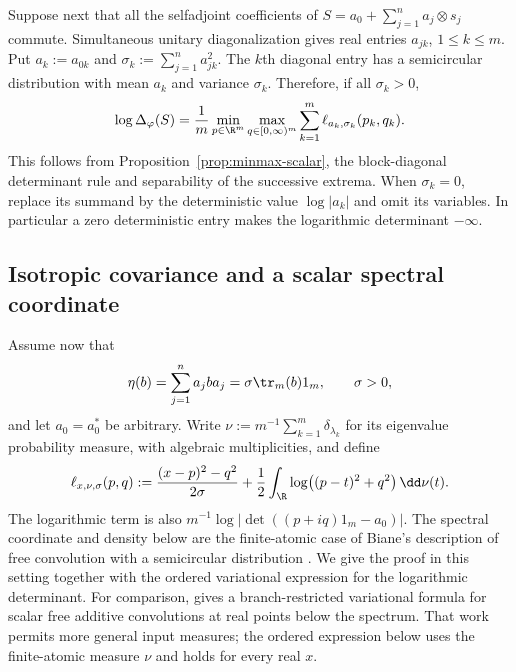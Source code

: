 Suppose next that all the selfadjoint coefficients of $S=a_0+\sum_{j=1}^n a_j\otimes s_j$ commute.
Simultaneous unitary diagonalization gives real entries $a_{jk}$, $1\le k\le m$.
Put $a_k:=a_{0k}$ and $\sigma_k:=\sum_{j=1}^n a_{jk}^2$.
The $k$th diagonal entry has a semicircular distribution with mean $a_k$ and variance $\sigma_k$.
Therefore, if all $\sigma_k>0$,
\begin{equation}\label{eq:minmax-commuting}
 \log\Delta_\varphi(S)
 =\frac1m\min_{p\in\R^m}\max_{q\in[0,\infty)^m}
       \sum_{k=1}^m\ell_{a_k,\sigma_k}(p_k,q_k).
\end{equation}
This follows from Proposition~\ref{prop:minmax-scalar}, the block-diagonal determinant rule and separability of the successive extrema.
When $\sigma_k=0$, replace its summand by the deterministic value $\log|a_k|$ and omit its variables.
In particular a zero deterministic entry makes the logarithmic determinant $-\infty$.

\subsection{Isotropic covariance and a scalar spectral coordinate}

Assume now that
\begin{equation}\label{eq:minmax-isotropy}
 \eta(b)=\sum_{j=1}^n a_jba_j
       =\sigma\tr_m(b)1_m,\qquad \sigma>0,
\end{equation}
and let $a_0=a_0^*$ be arbitrary.
Write $\nu:=m^{-1}\sum_{k=1}^m\delta_{\lambda_k}$ for its eigenvalue probability measure, with algebraic multiplicities, and define
\[
 \ell_{x,\nu,\sigma}(p,q)
 :=\frac{(x-p)^2-q^2}{2\sigma}
   +\frac12\int_\R\log\bigl((p-t)^2+q^2\bigr)\,\dd\nu(t).
\]
The logarithmic term is also $m^{-1}\log|\det((p+iq)1_m-a_0)|$.
The spectral coordinate and density below are the finite-atomic case of Biane's description of free convolution with a semicircular distribution \cite[Section 3, Lemma 4, Proposition 2 and Corollary 3]{Bia97}.
We give the proof in this setting together with the ordered variational expression for the logarithmic determinant.
For comparison, \cite[Theorem 1.1 and (1.6)]{BCG25} gives a branch-restricted variational formula for scalar free additive convolutions at real points below the spectrum.
That work permits more general input measures; the ordered expression below uses the finite-atomic measure $\nu$ and holds for every real $x$.

